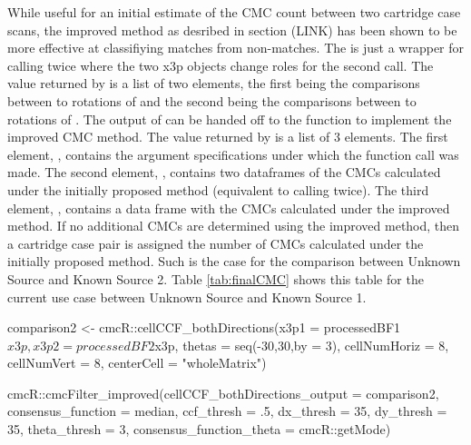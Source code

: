 While useful for an initial estimate of the CMC count between two
cartridge case scans, the improved method as desribed in section (LINK)
has been shown to be more effective at classifiying matches from
non-matches. The  is just a wrapper
for calling  twice where the two x3p objects change roles
for the second call. The value returned by
 is a list of two elements, the first
being the comparisons between  to rotations of 
and the second being the comparisons between  to rotations of
. The output of  can be handed
off to the  function to implement the
improved CMC method. The value returned by
 is a list of 3 elements. The first
element, , contains the argument specifications under which
the function call was made. The second element, ,
contains two dataframes of the CMCs calculated under the initially
proposed method (equivalent to calling  twice). The
third element, , contains a data frame with the CMCs
calculated under the improved method. If no additional CMCs are
determined using the improved method, then a cartridge case pair is
assigned the number of CMCs calculated under the initially proposed
method. Such is the case for the comparison between Unknown Source and
Known Source 2. Table \ref{tab:finalCMC} shows this table for the
current use case between Unknown Source and Known Source 1.

\begin{Schunk}
\begin{Sinput}
comparison2 <- cmcR::cellCCF_bothDirections(x3p1 = processedBF1$x3p,
                                            x3p2 = processedBF2$x3p,
                                            thetas = seq(-30,30,by = 3),
                                            cellNumHoriz = 8,
                                            cellNumVert = 8,
                                            centerCell = "wholeMatrix")

cmcR::cmcFilter_improved(cellCCF_bothDirections_output = comparison2,
                         consensus_function = median,
                         ccf_thresh = .5,
                         dx_thresh = 35,
                         dy_thresh = 35,
                         theta_thresh = 3,
                         consensus_function_theta = cmcR::getMode)
\end{Sinput}
\end{Schunk}


